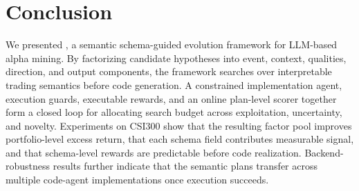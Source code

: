 \section{Conclusion}
\label{sec:conclusion}

We presented \method{}, a semantic schema-guided evolution framework for LLM-based alpha mining. By factorizing candidate hypotheses into event, context, qualities, direction, and output components, the framework searches over interpretable trading semantics before code generation. A constrained implementation agent, execution guards, executable rewards, and an online plan-level scorer together form a closed loop for allocating search budget across exploitation, uncertainty, and novelty. Experiments on CSI300 show that the resulting factor pool improves portfolio-level excess return, that each schema field contributes measurable signal, and that schema-level rewards are predictable before code realization. Backend-robustness results further indicate that the semantic plans transfer across multiple code-agent implementations once execution succeeds.
